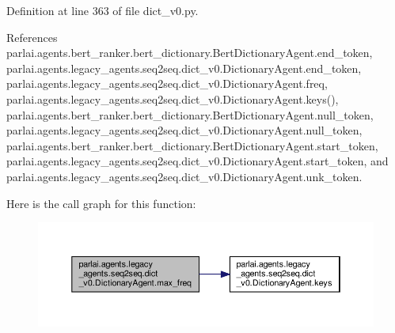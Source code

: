 Definition at line 363 of file dict\+\_\+v0.\+py.



References parlai.\+agents.\+bert\+\_\+ranker.\+bert\+\_\+dictionary.\+Bert\+Dictionary\+Agent.\+end\+\_\+token, parlai.\+agents.\+legacy\+\_\+agents.\+seq2seq.\+dict\+\_\+v0.\+Dictionary\+Agent.\+end\+\_\+token, parlai.\+agents.\+legacy\+\_\+agents.\+seq2seq.\+dict\+\_\+v0.\+Dictionary\+Agent.\+freq, parlai.\+agents.\+legacy\+\_\+agents.\+seq2seq.\+dict\+\_\+v0.\+Dictionary\+Agent.\+keys(), parlai.\+agents.\+bert\+\_\+ranker.\+bert\+\_\+dictionary.\+Bert\+Dictionary\+Agent.\+null\+\_\+token, parlai.\+agents.\+legacy\+\_\+agents.\+seq2seq.\+dict\+\_\+v0.\+Dictionary\+Agent.\+null\+\_\+token, parlai.\+agents.\+bert\+\_\+ranker.\+bert\+\_\+dictionary.\+Bert\+Dictionary\+Agent.\+start\+\_\+token, parlai.\+agents.\+legacy\+\_\+agents.\+seq2seq.\+dict\+\_\+v0.\+Dictionary\+Agent.\+start\+\_\+token, and parlai.\+agents.\+legacy\+\_\+agents.\+seq2seq.\+dict\+\_\+v0.\+Dictionary\+Agent.\+unk\+\_\+token.

Here is the call graph for this function\+:
\nopagebreak
\begin{figure}[H]
\begin{center}
\leavevmode
\includegraphics[width=350pt]{classparlai_1_1agents_1_1legacy__agents_1_1seq2seq_1_1dict__v0_1_1DictionaryAgent_a390adb45c505b2b35d3bd3e67aa301ee_cgraph}
\end{center}
\end{figure}
\mbox{\label{classparlai_1_1agents_1_1legacy__agents_1_1seq2seq_1_1dict__v0_1_1DictionaryAgent_a67ebc0fd49a9bcb850ae3d693b29b304}} 
